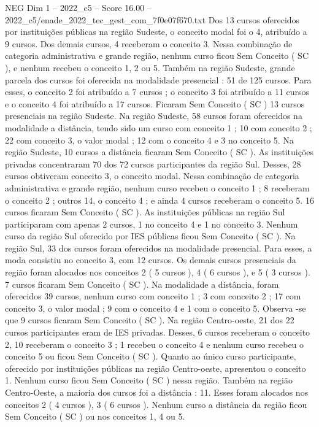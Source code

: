 \begin{textsample}{NEG Dim 1 – 2022\_c5 – Score 16.00 – 2022\_c5/enade\_2022\_tec\_gest\_com\_7f0e07f670.txt}
Dos 13 cursos oferecidos por instituições públicas na região Sudeste, o conceito modal foi o 4, atribuído a 9 cursos.
Dos demais cursos, 4 receberam o conceito 3.
Nessa combinação de categoria administrativa e grande região, nenhum curso ficou Sem Conceito ( SC ), e nenhum recebeu o conceito 1, 2 ou 5.
Também na região Sudeste, grande parcela dos cursos foi oferecida na modalidade presencial : 51 de 125 cursos.
Para esses, o conceito 2 foi atribuído a 7 cursos ; o conceito 3 foi atribuído a 11 cursos e o conceito 4 foi atribuído a 17 cursos.
Ficaram Sem Conceito ( SC ) 13 cursos presenciais na região Sudeste.
Na região Sudeste, 58 cursos foram oferecidos na modalidade a distância, tendo sido um curso com conceito 1 ; 10 com conceito 2 ; 22 com conceito 3, o valor modal ; 12 com o conceito 4 e 3 no conceito 5.
Na região Sudeste, 10 cursos a distância ficaram Sem Conceito ( SC ).
As instituições privadas concentraram 70 dos 72 cursos participantes da região Sul.
Desses, 28 cursos obtiveram conceito 3, o conceito modal.
Nessa combinação de categoria administrativa e grande região, nenhum curso recebeu o conceito 1 ; 8 receberam o conceito 2 ; outros 14, o conceito 4 ; e ainda 4 cursos receberam o conceito 5. 16 cursos ficaram Sem Conceito ( SC ).
As instituições públicas na região Sul participaram com apenas 2 cursos, 1 no conceito 4 e 1 no conceito 3.
Nenhum curso da região Sul oferecido por IES públicas ficou Sem Conceito ( SC ).
Na região Sul, 33 dos cursos foram oferecidos na modalidade presencial.
Para esses, a moda consistiu no conceito 3, com 12 cursos.
Os demais cursos presenciais da região foram alocados nos conceitos 2 ( 5 cursos ), 4 ( 6 cursos ), e 5 ( 3 cursos ). 7 cursos ficaram Sem Conceito ( SC ).
Na modalidade a distância, foram oferecidos 39 cursos, nenhum curso com conceito 1 ; 3 com conceito 2 ; 17 com conceito 3, o valor modal ; 9 com o conceito 4 e 1 com o conceito 5.
Observa -se que 9 cursos ficaram Sem Conceito ( SC ).
Na região Centro-oeste, 21 dos 22 cursos participantes eram de IES privadas.
Desses, 6 cursos receberam o conceito 2, 10 receberam o conceito 3 ; 1 recebeu o conceito 4 e nenhum curso recebeu o conceito 5 ou ficou Sem Conceito ( SC ).
Quanto ao único curso participante, oferecido por instituições públicas na região Centro-oeste, apresentou o conceito 1.
Nenhum curso ficou Sem Conceito ( SC ) nessa região.
Também na região Centro-Oeste, a maioria dos cursos foi a distância : 11.
Esses foram alocados nos conceitos 2 ( 4 cursos ), 3 ( 6 cursos ).
Nenhum curso a distância da região ficou Sem Conceito ( SC ) ou nos conceitos 1, 4 ou 5.

\end{textsample}
